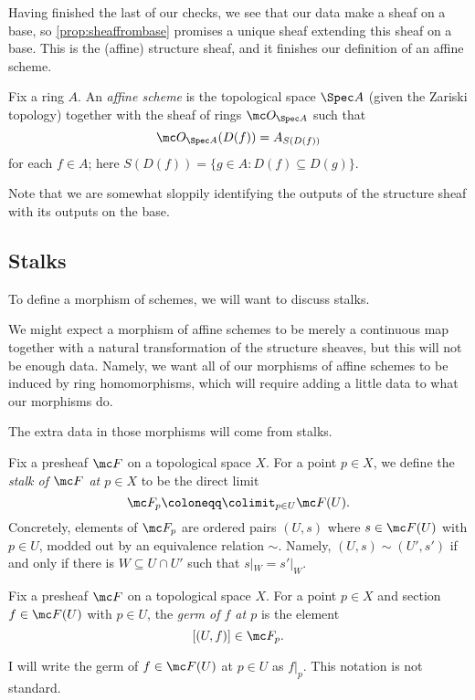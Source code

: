 \documentclass[../notes.tex]{subfiles}
\begin{document}
Having finished the last of our checks, we see that our data make a sheaf on a base, so \autoref{prop:sheaffrombase} promises a unique sheaf extending this sheaf on a base. This is the (affine) structure sheaf, and it finishes our definition of an affine scheme.
\begin{definition}
	Fix a ring $A$. An \textit{affine scheme} is the topological space $\Spec A$ (given the Zariski topology) together with the sheaf of rings $\mc O_{\Spec A}$ such that
	\[\mc O_{\Spec A}(D(f))=A_{S(D(f))}\]
	for each $f\in A$; here $S(D(f))=\{g\in A:D(f)\subseteq D(g)\}$.
\end{definition}
Note that we are somewhat sloppily identifying the outputs of the structure sheaf with its outputs on the base.

\subsection{Stalks}
To define a morphism of schemes, we will want to discuss stalks.
\begin{remark}
	We might expect a morphism of affine schemes to be merely a continuous map together with a natural transformation of the structure sheaves, but this will not be enough data. Namely, we want all of our morphisms of affine schemes to be induced by ring homomorphisms, which will require adding a little data to what our morphisms do.
\end{remark}
The extra data in those morphisms will come from stalks.
\begin{definition}[Stalk]
	Fix a presheaf $\mc F$ on a topological space $X$. For a point $p\in X$, we define the \textit{stalk of $\mc F$ at $p\in X$} to be the direct limit
	\[\mc F_p\coloneqq\colimit_{p\in U}\mc F(U).\]
	Concretely, elements of $\mc F_p$ are ordered pairs $(U,s)$ where $s\in\mc F(U)$ with $p\in U$, modded out by an equivalence relation $\sim$. Namely, $(U,s)\sim(U',s')$ if and only if there is $W\subseteq U\cap U'$ such that $s|_W=s'|_W$.
\end{definition}
\begin{definition}[Germ]
	Fix a presheaf $\mc F$ on a topological space $X$. For a point $p\in X$ and section $f\in\mc F(U)$ with $p\in U$, the \textit{germ of $f$ at $p$} is the element
	\[[(U,f)]\in\mc F_p.\]
\end{definition}
\begin{notation}
	I will write the germ of $f\in\mc F(U)$ at $p\in U$ as $f|_p$. This notation is not standard.
\end{notation}
\end{document}
